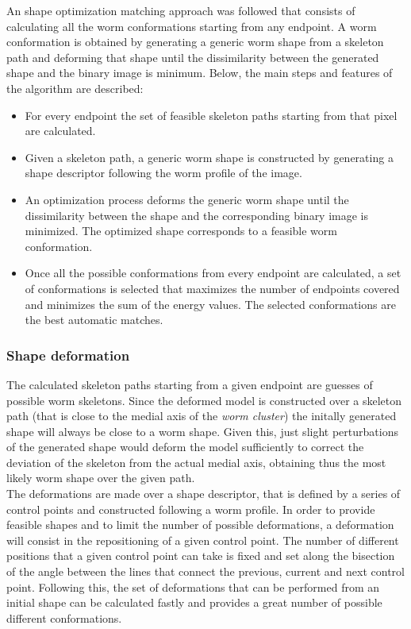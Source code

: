 An shape optimization matching approach was followed that consists of calculating all the 
worm conformations starting from any endpoint. A worm conformation is obtained by generating
a generic worm shape from a skeleton path and deforming that shape until the dissimilarity
between the generated shape and the binary image is minimum. Below, the main steps and 
features of the algorithm are described:

\begin{itemize}
\item For every endpoint the set of feasible skeleton paths starting from that pixel
  are calculated.
\item Given a skeleton path, a generic worm shape is constructed by generating a shape
descriptor following the worm profile of the image.
\item An optimization process deforms the generic worm shape until the dissimilarity
between the shape and the corresponding binary image is minimized. The optimized
shape corresponds to a feasible worm conformation.
\item Once all the possible conformations from every endpoint are calculated, a set of
conformations is selected that maximizes the number of endpoints covered and minimizes
the sum of the energy values. The selected conformations are the best automatic matches.
\end{itemize}

\subsubsection*{Shape deformation}

The calculated skeleton paths starting from a given endpoint are guesses of possible
worm skeletons. Since the deformed model is constructed over a skeleton path 
(that is close to the medial axis of the \emph{worm cluster}) the initally generated 
shape will always be close to a worm shape. Given this, just slight perturbations of
the generated shape would deform the model sufficiently to correct the deviation of the
skeleton from the actual medial axis, obtaining thus the most likely worm shape
over the given path.\\

The deformations are made over a shape descriptor, that is defined by a series of 
control points and constructed following a worm profile. In order to provide feasible
shapes and to limit the number of possible deformations, a deformation will consist
in the repositioning of a given control point. The number of different positions that a 
given control point can take is fixed and set along the bisection of the angle between
the lines that connect the previous, current and next control point. 
Following this, the set of deformations that can be performed from an initial shape 
can be calculated fastly and provides a great number of possible different conformations.\\

